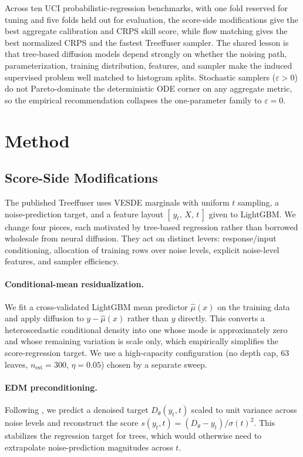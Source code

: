 \documentclass{uai2026}
\begin{document}
Across ten UCI probabilistic-regression benchmarks, with one fold reserved for tuning and five folds held out for evaluation, the score-side modifications give the best aggregate calibration and CRPS skill score, while flow matching gives the best normalized CRPS and the fastest Treeffuser sampler. The shared lesson is that tree-based diffusion models depend strongly on whether the noising path, parameterization, training distribution, features, and sampler make the induced supervised problem well matched to histogram splits. Stochastic samplers ($\varepsilon > 0$) do not Pareto-dominate the deterministic ODE corner on any aggregate metric, so the empirical recommendation collapses the one-parameter family to $\varepsilon = 0$.

\section{Method}\label{sec:method}

\subsection{Score-Side Modifications}\label{sec:score-side}
The published Treeffuser uses VESDE marginals with uniform $t$ sampling, a noise-prediction target, and a feature layout $[\,y_t,\,X,\,t\,]$ given to LightGBM. We change four pieces, each motivated by tree-based regression rather than borrowed wholesale from neural diffusion. They act on distinct levers: response/input conditioning, allocation of training rows over noise levels, explicit noise-level features, and sampler efficiency.

\paragraph{Conditional-mean residualization.} We fit a cross-validated LightGBM mean predictor $\hat{\mu}(x)$ on the training data and apply diffusion to $y - \hat{\mu}(x)$ rather than $y$ directly. This converts a heteroscedastic conditional density into one whose mode is approximately zero and whose remaining variation is scale only, which empirically simplifies the score-regression target. We use a high-capacity configuration (no depth cap, 63 leaves, $n_{\text{est}}{=}300$, $\eta{=}0.05$) chosen by a separate sweep.

\paragraph{EDM preconditioning.} Following \citet{karras2022edm}, we predict a denoised target $D_\theta(y_t, t)$ scaled to unit variance across noise levels and reconstruct the score $s(y_t, t) = (D_\theta - y_t)/\sigma(t)^2$. This stabilizes the regression target for trees, which would otherwise need to extrapolate noise-prediction magnitudes across $t$.
\end{document}
